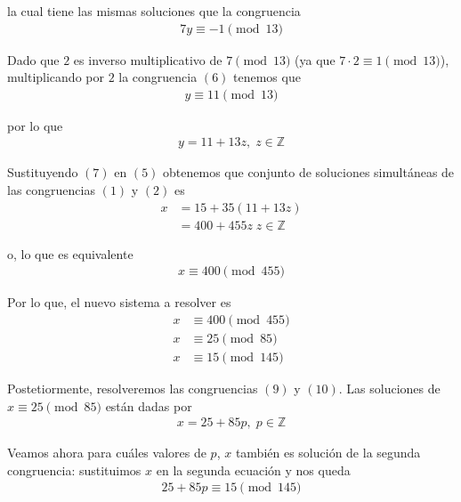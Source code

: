 \documentclass[letterpaper,10pt]{article}
\begin{document}
\begin{enumerate}
\begin{itemize}
        la cual tiene las mismas soluciones que la congruencia
        \begin{align}
            7y \equiv -1 \pmod{13}
        \end{align}
        
        Dado que $2$ es inverso multiplicativo de $7 \pmod{13}$ (ya que 
        $7 \cdot 2 \equiv 1 \pmod{13}$), multiplicando por $2$ la congruencia
        $(6)$ tenemos que
        \begin{align*}
            y \equiv 11 \pmod{13} 
        \end{align*}
        
        por lo que
        \begin{align}
            y = 11 + 13z, \; z \in \mathbb{Z}
        \end{align}
        
        Sustituyendo $(7)$ en $(5)$ obtenemos que conjunto de soluciones 
        simultáneas de las congruencias $(1)$ y $(2)$ es 
        \begin{align*}
            x 
            &= 15 + 35(11 + 13z) \\
            &= 400 + 455z\; z \in \mathbb{Z}
        \end{align*}
        
        o, lo que es equivalente
        \begin{align*}
            x \equiv 400 \pmod{455}
        \end{align*}
        
        Por lo que, el nuevo sistema a resolver es
        \begin{align}
            x &\equiv 400 \pmod{455} \\
            x &\equiv 25 \pmod{85} \\
            x &\equiv 15 \pmod{145}
        \end{align}
        
        Postetiormente, resolveremos las congruencias $(9)$ y $(10)$. Las 
        soluciones de $x \equiv 25 \pmod{85}$ están dadas por
        \begin{align}
            x = 25 + 85p, \; p \in \mathbb{Z}
        \end{align}
        
        Veamos ahora para cuáles valores de $p$, $x$ también es solución de la 
        segunda congruencia: sustituimos $x$ en la segunda ecuación y nos queda
        \begin{align*}
            25 + 85p \equiv 15 \pmod{145}
        \end{align*}
        

\end{itemize}
\end{enumerate}
\end{document}
